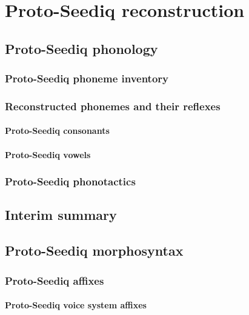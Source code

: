 \chapter{Proto-Seediq reconstruction}
\lipsum[1-2]

\section{Proto-Seediq phonology}

\subsection{Proto-Seediq phoneme inventory}

\subsection{Reconstructed phonemes and their reflexes}

\subsubsection{Proto-Seediq consonants}

\subsubsection{Proto-Seediq vowels}

\subsection{Proto-Seediq phonotactics}

\section{Interim summary}
\lipsum[1]

\section{Proto-Seediq morphosyntax}

\subsection{Proto-Seediq affixes}

\subsubsection{Proto-Seediq voice system affixes}

